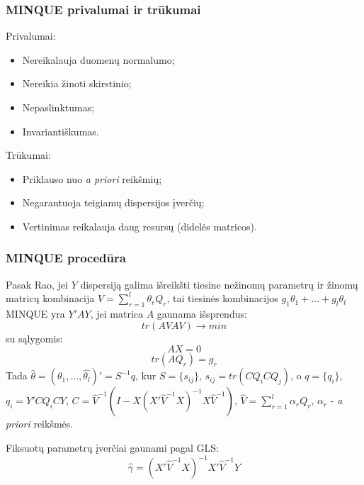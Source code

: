 \documentclass[utf8,hyperref={unicode,pdftex}]{beamer}
\begin{document}
\begin{frame}
\frametitle{MINQUE privalumai ir trūkumai}
Privalumai:
\begin{itemize}
\item Nereikalauja duomenų normalumo;
\item Nereikia žinoti skirstinio;
\item Nepaslinktumas;
\item Invariantiškumas.
\end{itemize}
Trūkumai:
\begin{itemize}
\item Priklauso nuo \textit{a priori} reikšmių;
\item Negarantuoja teigiamų dispersijos įverčių;
\item Vertinimas reikalauja daug resursų (didelės matricos).
\end{itemize}
\end{frame}



\begin{frame}
\frametitle{MINQUE procedūra}
Pasak Rao, jei $Y$ dispersiją galima išreikšti tiesine nežinomų parametrų ir žinomų matricų kombinacija $V= \sum^l_{r=1}\theta_r Q_r$, tai tiesinės kombinacijos $g_1 \theta_1+\dots+g_l \theta_l$ MINQUE yra $Y'AY$, jei matrica $A$ gaunama išsprendus:
\[tr(AVAV) \to min\]
su sąlygomis:
\[AX = 0\]
\[tr(AQ_r)=g_r\]
Tada $\hat{\theta} = (\hat{\theta_1},\dots,\hat{\theta_l})'=S^{-1}q$, kur $S=\{s_{ij}\}$, $s_{ij}=tr(CQ_iCQ_j)$, o
$q=\{q_i\}$, $q_i=Y'CQ_iCY$, $C = \hat{V}^{-1}(I-X(X' \hat{V}^{-1}X)^{-1}X \hat{V}^{-1})$, $\hat{V}=\sum^l_{r=1}\alpha_rQ_r$, $\alpha_r$ - \textit{a priori} reikšmės.

Fiksuotų parametrų įverčiai gaunami pagal GLS:
\[\hat{\gamma}=(X'\hat{V}^{-1}X)^{-1}X'\hat{V}^{-1}Y\]
\end{frame}
\end{document}
